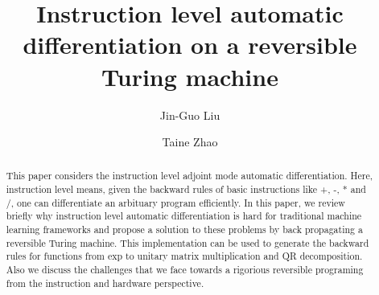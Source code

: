 \documentclass[aps,twocolumn,longbibliography,english,superscriptaddress,prr]{revtex4-1}
\newcommand{\<}{\langle}
\renewcommand{\>}{\rangle}
\theoremstyle{definition}\newtheorem{definition}{\textit{Definition}}
\begin{document}
\title{Instruction level automatic differentiation on a reversible Turing machine}


\author{Jin-Guo Liu}

\author{Taine Zhao}

\begin{abstract}
    This paper considers the instruction level adjoint mode automatic differentiation. Here, instruction level means, given the backward rules of basic instructions like +, -, * and /, one can differentiate an arbituary program efficiently. In this paper, we review briefly why instruction level automatic differentiation is hard for traditional machine learning frameworks and propose a solution to these problems by back propagating a reversible Turing machine. This implementation can be used to generate the backward rules for functions from exp to unitary matrix multiplication and QR decomposition. Also we discuss the challenges that we face towards a rigorious reversible programing from the instruction and hardware perspective.
\end{abstract}


\maketitle

\end{document}
